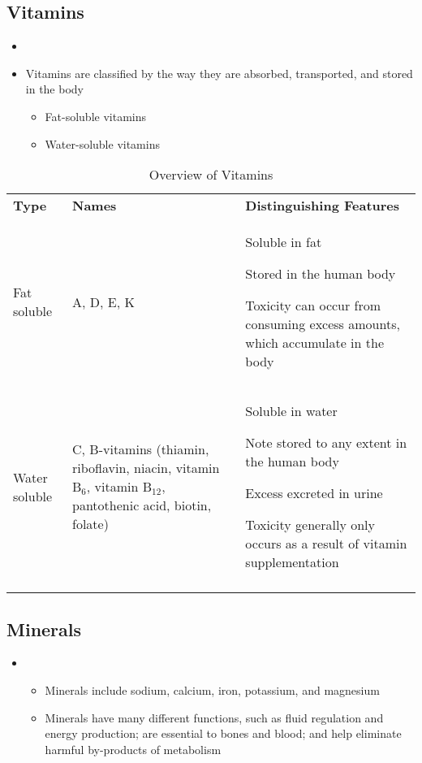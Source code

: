 \documentclass[title={Chapter 1}]{fdsn201notes}
\begin{document}
\subsection{Vitamins}\label{subsec:vitamins-2}
\begin{itemize}
	\item {}
	\item Vitamins are classified by the way they are absorbed, transported, and stored in the body
	\begin{itemize}
		\item Fat-soluble vitamins
		\item Water-soluble vitamins
	\end{itemize}
\end{itemize}

\begin{table}[H]
	\centering
	\caption{Overview of Vitamins}
	\label{tab:vitamin-overview}
	\begin{tabular}{p{} p{} p{}}
		\rowcolor{rowdarkgreen}\textbf{Type} & \textbf{Names} & \textbf{Distinguishing Features}\\
		Fat soluble & A, D, E, K & Soluble in fat

		Stored in the human body

		Toxicity can occur from consuming excess amounts, which accumulate in the body\\
		Water soluble & C, B-vitamins (thiamin, riboflavin, niacin, vitamin $\mbox{B}_{6}$, vitamin $\mbox{B}_{12}$, pantothenic acid, biotin, folate) & Soluble in water

		Note stored to any extent in the human body

		Excess excreted in urine

		Toxicity generally only occurs as a result of vitamin supplementation\\
		\rowcolor{rowdarkgreen} & & \\
	\end{tabular}
\end{table}

\subsection{Minerals}\label{subsec:minerals-2}
\begin{itemize}
	\item {}
	\begin{itemize}
		\item Minerals include sodium, calcium, iron, potassium, and magnesium
		\item Minerals have many different functions, such as fluid regulation and energy production; are essential to bones and blood; and help eliminate harmful by-products of metabolism
	\end{itemize}
\end{itemize}
\end{document}

